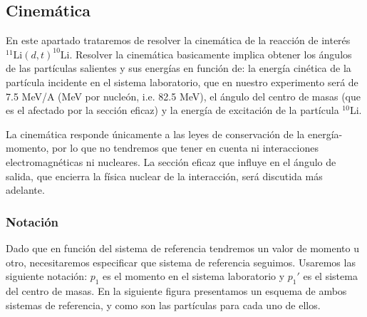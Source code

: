 \subsection{Cinemática} \label{Subsec:03-cinematica}

En este apartado trataremos de resolver la cinemática de la reacción de interés $^{11}\text{Li}(d,t)^{10}\text{Li}$. Resolver la cinemática basicamente implica obtener los ángulos de las partículas salientes y sus energías en función de: la energía cinética de la partícula incidente en el sistema laboratorio, que en nuestro experimento será de 7.5 MeV/A (MeV por nucleón, i.e. 82.5 MeV), el ángulo del centro de masas (que es el afectado por la sección eficaz) y la energía de excitación de la partícula $^{10}$Li.

La cinemática responde únicamente a las leyes de conservación de la energía-momento, por lo que no tendremos que tener en cuenta ni interacciones electromagnéticas ni nucleares. La sección eficaz que influye en el ángulo de salida, que encierra la física nuclear de la interacción, será discutida más adelante.

\subsubsection{Notación}
Dado que en función del sistema de referencia tendremos un valor de momento u otro, necesitaremos especificar que sistema de referencia seguimos. Usaremos las siguiente notación: $p_{1}$ es el momento en el sistema laboratorio y $p_{1}'$ es el sistema del centro de masas. En la siguiente figura presentamos un esquema de ambos sistemas de referencia, y como son las partículas para cada uno de ellos.

